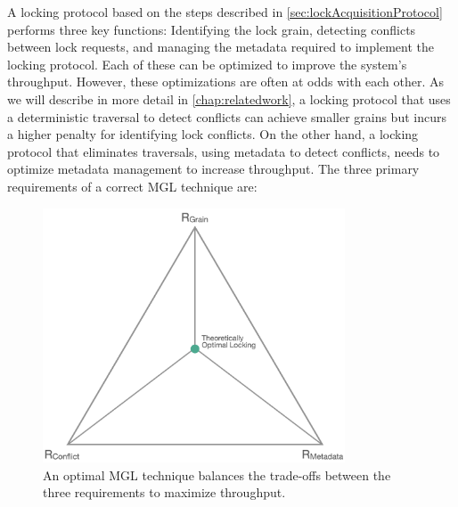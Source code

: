 A locking protocol based on the steps described in \cref{sec:lockAcquisitionProtocol} performs three key functions: Identifying the lock grain, detecting conflicts between lock requests, and managing the metadata required to implement the locking protocol. Each of these can be optimized to improve the system's throughput. However, these optimizations are often at odds with each other. As we will describe in more detail in \cref{chap:relatedwork}, a locking protocol that uses a deterministic traversal to detect conflicts can achieve smaller grains but incurs a higher penalty for identifying lock conflicts. On the other hand, a locking protocol that eliminates traversals, using metadata to detect conflicts, needs to optimize metadata management to increase throughput. The three primary requirements of a correct MGL technique are:

\begin{figure}
    \centering
    \captionsetup{justification=centering}
    \includegraphics[width=0.8\textwidth]{figures/IdealMGLTechnique.png}
    \caption{An optimal MGL technique balances the trade-offs between the three requirements to maximize throughput.}
    \label{fig:lock_throughput}
\end{figure}

